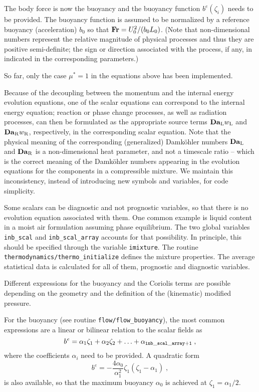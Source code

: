 The body force is now the buoyancy and the buoyancy function $b^e(\zeta_i)$ needs to be provided. The buoyancy function is assumed to be normalized by a reference buoyancy (acceleration) $b_0$ so that $\mathrm{\bf   Fr}=U_0^2/(b_0L_0)$. (Note that non-dimensional numbers represent the relative magnitude of physical processes and thus they are positive semi-definite; the sign or direction associated with the process, if any, in indicated in the corresponding parameters.)

So far, only the case $\mu^*=1$ in the equations above has been implemented.

Because of the decoupling between the momentum and the internal energy evolution equations, one of the scalar equations can correspond to the internal energy equation; reaction or phase change processes, as well as radiation processes, can then be formulated as the appropriate source terms $\mathrm{\bf   Da}_\mathrm{L}w_\mathrm{L}$ and $\mathrm{\bf Da}_\mathrm{R}w_\mathrm{R}$, respectively, in the corresponding scalar equation. Note that the physical meaning of the corresponding (generalized) Damk{\"o}hler numbers $\mathrm{\bf   Da}_\mathrm{L}$ and $\mathrm{\bf Da}_\mathrm{R}$ is a non-dimensional heat parameter, and not a timescale ratio -- which is the correct meaning of the Damk{\"o}hler numbers appearing in the evolution equations for the components in a compressible mixture. We maintain this inconsistency, instead of introducing new symbols and variables, for code simplicity.

Some scalars can be diagnostic and not prognostic variables, so that there is no evolution equation associated with them. One common example is liquid content in a moist air formulation assuming phase equilibrium. The two global variables {\tt inb\_scal} and {\tt inb\_scal\_array} accounts for that possibility. In principle, this should be specified through the variable {\tt imixture}. The routine {\tt thermodynamics/thermo\_initialize} defines the mixture properties. The average statistical data is calculated for all of them, prognostic and diagnostic variables.

Different expressions for the buoyancy and the Coriolis terms are possible depending on the geometry and the definition of the (kinematic) modified pressure. 

For the buoyancy (see routine {\tt flow/flow\_buoyancy}), the most common expressions are a linear or bilinear relation to the scalar fields as
\begin{equation}
b^e=\alpha_1\zeta_1+\alpha_2\zeta_2+\ldots+\alpha_\mathrm{\tt inb\_scal\_array+1}\;,
\end{equation}
where the coefficients $\alpha_i$ need to be provided. A quadratic form 
\begin{equation}
b^e=-\frac{4\alpha_0}{\alpha_1^2}\zeta_1(\zeta_1-\alpha_1) \;,
\end{equation}
is also available, so that the maximum buoyancy $\alpha_0$ is achieved at
$\zeta_1=\alpha_1/2$. 

